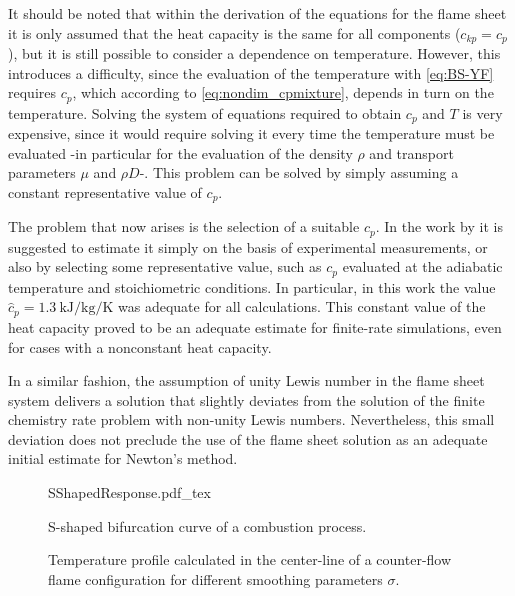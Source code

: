 It should be noted that within the derivation of the equations for the flame sheet it is only assumed that the heat capacity is the same for all components ($c_{kp} = c_p$), but it is still possible to consider a dependence on temperature. However, this introduces a difficulty, since the evaluation of the temperature with \cref{eq:BS-YF} requires $c_p$, which according to \cref{eq:nondim_cpmixture}, depends in turn on the temperature. Solving the system of equations required to obtain $c_p$ and $T$ is very expensive, since it would require solving it every time the temperature must be evaluated -in particular for the evaluation of the density $\rho$ and transport parameters $\mu$ and $\rho D$-.  This problem can be solved by simply assuming a constant representative value of $c_p$. 

The problem that now arises is the selection of a suitable $c_p$. In the work by \textcite{xuApplicationPrimitiveVariable1993} it is suggested to estimate it simply on the basis of experimental measurements, or also by selecting some representative value, such as $c_p$ evaluated at the adiabatic temperature and stoichiometric conditions. In particular, in this work the value $\hat c_p = \SI{1.3}{\kilo \joule \per \kilo \gram \per \kelvin}$ was adequate for all calculations. This constant value of the heat capacity proved to be an adequate estimate for finite-rate simulations, even for cases with a nonconstant heat capacity.

In a similar fashion, the assumption of unity Lewis number in the flame sheet system delivers a solution that slightly deviates from the solution of the finite chemistry rate problem with non-unity Lewis numbers. Nevertheless, this small deviation does not preclude the use of the flame sheet solution as an adequate initial estimate for Newton's method. 






\begin{figure}[t!]
	\begin{center}
		\def\svgwidth{0.5\textwidth}
		{SShapedResponse.pdf_tex}
		\caption{S-shaped bifurcation curve of a combustion process.}
		\label{fig:Sshaped}%
	\end{center}%
\end{figure}%


\begin{figure}
	\centering
	\caption{Temperature profile calculated in the center-line of a counter-flow flame configuration for different smoothing parameters $\sigma$.}
	\label{fig:smoothings}
\end{figure}

